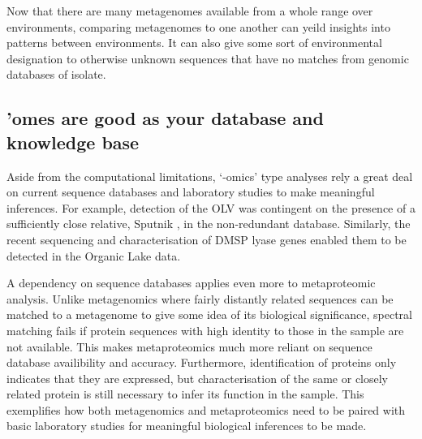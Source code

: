 Now that there are many metagenomes available from a whole range over environments, comparing metagenomes to one another can yeild insights into patterns between environments.
It can also give some sort of environmental designation to otherwise unknown sequences that have no matches from genomic databases of isolate.


\subsection{ 'omes are good as your database and knowledge base}
Aside from the computational limitations, `-omics' type analyses rely a great deal on current sequence databases and laboratory studies to make meaningful inferences.
For example, detection of the \ac{OLV} was contingent on the presence of a sufficiently close relative, Sputnik \cite{LaScola2008}, in the non-redundant database.
Similarly, the recent sequencing and characterisation of \ac{DMSP} lyase genes enabled them to be detected in the Organic Lake data.

A dependency on sequence databases applies even more to metaproteomic analysis.
Unlike metagenomics where fairly distantly related sequences can be matched to a metagenome to give some idea of its biological significance, spectral matching fails if protein sequences with high identity to those in the sample are not available.
This makes metaproteomics much more reliant on sequence database availibility and accuracy.
Furthermore, identification of proteins only indicates that they are expressed, but characterisation of the same or closely related protein is still necessary to infer its function in the sample.
This exemplifies how both metagenomics and metaproteomics need to be paired with basic laboratory studies for meaningful biological inferences to be made.


